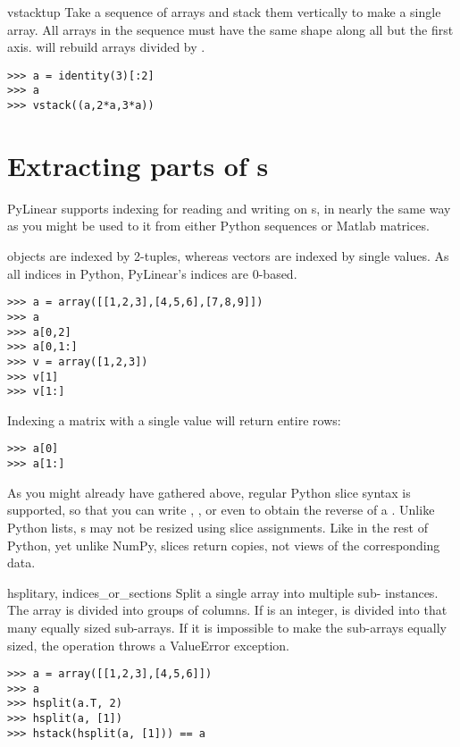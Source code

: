 \begin{funcdesc}{vstack}{tup}
  Take a sequence of arrays and stack them vertically to make a single array.
  All arrays in the sequence must have the same shape along all but the first
  axis.  will rebuild arrays divided by .
  
\begin{verbatim}
>>> a = identity(3)[:2]
>>> a
>>> vstack((a,2*a,3*a))
\end{verbatim}
\end{funcdesc}

\section{Extracting parts of s}

PyLinear supports indexing for reading and writing on s, in nearly
the same way as you might be used to it from either Python sequences or Matlab
matrices.

 objects are indexed by 2-tuples, whereas vectors are indexed by
single values. As all indices in Python, PyLinear's indices are 0-based.

\begin{verbatim}
>>> a = array([[1,2,3],[4,5,6],[7,8,9]])
>>> a
>>> a[0,2]
>>> a[0,1:]
>>> v = array([1,2,3])
>>> v[1]
>>> v[1:]
\end{verbatim}

Indexing a matrix with a single value will return entire rows: 

\begin{verbatim}
>>> a[0]
>>> a[1:]
\end{verbatim}

As you might already have gathered above, regular Python slice syntax is
supported, so that you can write , , or even
 to obtain the reverse of a . Unlike Python lists,
s may not be resized using slice assignments. Like in the rest of
Python, yet unlike NumPy, slices return copies, not views of the corresponding
data.

\begin{funcdesc}{hsplit}{ary, indices_or_sections}
  Split a single  array into multiple sub-
  instances.  The array is divided into groups of columns.  If
   is an integer,  is divided into that
  many equally sized sub-arrays.  If it is impossible to make the sub-arrays
  equally sized, the operation throws a ValueError exception. 
  
\begin{verbatim}
>>> a = array([[1,2,3],[4,5,6]])
>>> a
>>> hsplit(a.T, 2)
>>> hsplit(a, [1])
>>> hstack(hsplit(a, [1])) == a
\end{verbatim}
\end{funcdesc}

